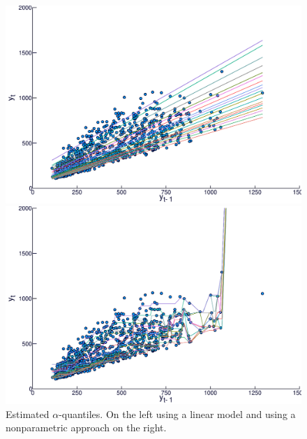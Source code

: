 \begin{figure}
  \centering
  \begin{minipage}[t]{\linewidth}
    \centering
    \begin{minipage}[t]{0.45\linewidth}
      \centering     \includegraphics[width=\textwidth]{Figuras/regressao-quantilica/quantile-linear-scatter}
    \end{minipage}
    \begin{minipage}[t]{0.45\linewidth}
      \centering     \includegraphics[width=\textwidth]{Figuras/regressao-quantilica/quantile-nonpar-scatter}
    \end{minipage}
  \end{minipage}
  \caption{Estimated $\alpha$-quantiles. On the left using a linear model and using a nonparametric approach on the right.}
  \label{fig:scatterplot-alphaquantiles}
\end{figure}




